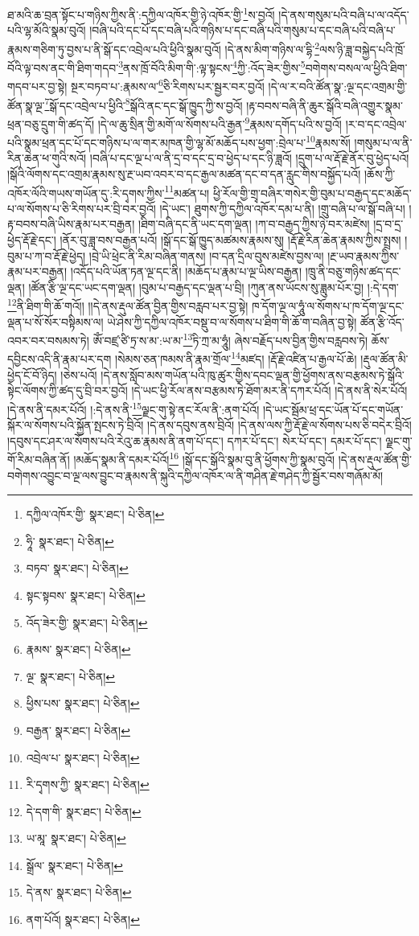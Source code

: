ཐ་མའི་ཆ་བྲན་སྟོང་པ་གཉིས་ཀྱིས་ནི་:དཀྱིལ་འཁོར་གྱི་ཉེ་འཁོར་གྱི་\footnote{དཀྱིལ་འཁོར་གྱི་  སྣར་ཐང་།  པེ་ཅིན། }ས་བྱའོ། །དེ་ནས་གསུམ་པའི་བཞི་པ་ལ་འདོད་པའི་ལྷ་མོའི་སྣམ་བུའོ། །བཞི་པའི་དང་པོ་དང་བཞི་པའི་གཉིས་པ་དང་བཞི་པའི་གསུམ་པ་དང་བཞི་པའི་བཞི་པ་རྣམས་གཅིག་ཏུ་བྱས་པ་ནི་སྒོ་དང་འབྲེལ་པའི་ཕྱིའི་སྣམ་བུའོ། །དེ་ནས་མིག་གཉིས་ལ་དྷི་\footnote{ཧཱི་  སྣར་ཐང་།  པེ་ཅིན། }ལས་ཉི་ཟླ་བསྐྱེད་པའི་ཁྲོ་བོའི་ལྟ་བས་ནང་གི་ཐིག་གདབ་\footnote{བཏབ་  སྣར་ཐང་།  པེ་ཅིན། }ནས་ཁྲོ་བོའི་མིག་གི་:ལྟ་སྟངས་\footnote{སྟང་སྟབས་  སྣར་ཐང་།  པེ་ཅིན། }ཀྱི་:འོད་ཟེར་གྱིས་\footnote{འོད་ཟེར་གྱི་  སྣར་ཐང་།  པེ་ཅིན། }བགེགས་བསལ་ལ་ཕྱིའི་ཐིག་གདབ་པར་བྱ་སྟེ། སྔར་བཏབ་པ་:རྣམས་ལ་\footnote{རྣམས་  སྣར་ཐང་།  པེ་ཅིན། }ཅི་རིགས་པར་སྦྱར་བར་བྱའོ། །དེ་ལ་ར་བའི་ཚོན་སྣ་:ལྔ་དང་འགྲམ་གྱི་ཚོན་སྣ་ལྔ་\footnote{ལྔ་  སྣར་ཐང་།  པེ་ཅིན། }སྒོ་དང་འབྲེལ་པ་ཕྱིའི་\footnote{ཕྱིས་པས་  སྣར་ཐང་།  པེ་ཅིན། }སྒོའི་ནང་དང་སྒོ་ཁྱུད་ཀྱི་ས་བྱའོ། །རྟ་བབས་བཞི་ནི་ཆུར་སྒོའི་བཞི་འགྱུར་སྣམ་ཕྲན་བཅུ་དྲུག་གི་ཚད་དོ། །དེ་ལ་ཆུ་སྲིན་གྱི་མགོ་ལ་སོགས་པའི་རྒྱན་\footnote{བརྒྱན་  སྣར་ཐང་།  པེ་ཅིན། }རྣམས་དགོད་པའི་ས་བྱའོ། །ར་བ་དང་འབྲེལ་པའི་སྣམ་ཕྲན་དང་པོ་དང་གཉིས་པ་ལ་གར་མཁན་གྱི་ལྷ་མོ་མཆོད་པས་ཕྱག་:བྲེལ་པ་\footnote{འབྲེལ་པ་  སྣར་ཐང་།  པེ་ཅིན། }རྣམས་སོ། །གསུམ་པ་ལ་ནི་རིན་ཆེན་ཕ་གུའི་སའོ། །བཞི་པ་དང་ལྔ་པ་ལ་ནི་དྲ་བ་དང་དྲ་བ་ཕྱེད་པ་དང་ཉི་ཟླའོ། །དྲུག་པ་ལ་རྡོ་རྗེ་ནོར་བུ་ཕྱེད་པའོ། །སྒོའི་ལོགས་དང་འགྲམ་རྣམས་སུ་རྔ་ཡབ་འབར་བ་དང་རྒྱལ་མཚན་དང་བ་དན་རླུང་གིས་བསྐྱོད་པའོ། །ཆོས་ཀྱི་འཁོར་ལོའི་གཡས་གཡོན་དུ་:རི་དྭགས་ཀྱིས་\footnote{རི་དྭགས་ཀྱི་  སྣར་ཐང་།  པེ་ཅིན། }མཚན་པ། ཕྱི་རོལ་གྱི་གྲྭ་བཞིར་གསེར་གྱི་བུམ་པ་བརྒྱད་དང་མཆོད་པ་ལ་སོགས་པ་ཅི་རིགས་པར་བྲི་བར་བྱའོ། །དེ་ཡང་། ཐུགས་ཀྱི་དཀྱིལ་འཁོར་དམ་པ་ནི། །གྲུ་བཞི་པ་ལ་སྒོ་བཞི་པ། །རྟ་བབས་བཞི་ཡིས་རྣམ་པར་བརྒྱན། །ཐིག་བཞི་དང་ནི་ཡང་དག་ལྡན། །ཀ་བ་བརྒྱད་ཀྱིས་ཉེ་བར་མཛེས། །དྲ་བ་དྲ་ཕྱེད་རྡོ་རྗེ་དང་། །ནོར་བུ་ཟླ་བས་བརྒྱན་པའོ། །སྒོ་དང་སྒོ་ཁྱུད་མཚམས་རྣམས་སུ། །རྡོ་རྗེ་རིན་ཆེན་རྣམས་ཀྱིས་སྤྲས། །བུམ་པ་ཀ་བ་རྡོ་རྗེ་ཕྱེད། །བྲེ་ཡི་ཕྲེང་ནི་རིམ་བཞིན་གནས། །བ་དན་དྲིལ་བུས་མཛེས་བྱས་ལ། །རྔ་ཡབ་རྣམས་ཀྱིས་རྣམ་པར་བརྒྱན། །འདོད་པའི་ཡོན་ཏན་ལྔ་དང་ནི། །མཆོད་པ་རྣམ་པ་ལྔ་ཡིས་བརྒྱན། །ཁྲུ་ནི་བཅུ་གཉིས་ཚད་དང་ལྡན། །ཚོན་རྩི་ལྔ་དང་ཡང་དག་ལྡན། །བུམ་པ་བརྒྱད་དང་ལྡན་པ་བྲི། །ཀུན་ནས་ཡོངས་སུ་ཟླུམ་པོར་བྱ། །:དེ་དག་\footnote{དེ་དག་གི་  སྣར་ཐང་།  པེ་ཅིན། }ནི་ཐིག་གི་ཆོ་གའོ།། །།དེ་ནས་རྡུལ་ཚོན་བྱིན་གྱིས་བརླབ་པར་བྱ་སྟེ། ཁ་དོག་ལྔ་ལ་ཧཱུཾ་ལ་སོགས་པ་ཁ་དོག་ལྔ་དང་ལྡན་པ་སོ་སོར་བསྟིམས་ལ། ཡེ་ཤེས་ཀྱི་དཀྱིལ་འཁོར་བསྡུ་བ་ལ་སོགས་པ་ཐིག་གི་ཆོ་ག་བཞིན་བྱ་སྟེ། ཚོན་རྩི་འོད་འབར་བར་བསམས་ཏེ། ཨོཾ་བཛྲ་ཙི་ཏྲ་ས་མ་:ཡ་མ་\footnote{ཡ་མཱ་  སྣར་ཐང་།  པེ་ཅིན། }ཏི་ཀྲ་མ་ཧཱུཾ། ཞེས་བརྗོད་པས་བྱིན་གྱིས་བརླབས་ཏེ། ཆོས་དབྱིངས་འདི་ནི་རྣམ་པར་དག །སེམས་ཅན་ཁམས་ནི་རྣམ་གྲོལ་\footnote{སྒྲོལ་  སྣར་ཐང་།  པེ་ཅིན། }མཛད། །རྡོ་རྗེ་འཛིན་པ་རྒྱལ་པོ་ཆེ། །རྡུལ་ཚོན་མི་ཕྱེད་ངོ་བོ་ཉིད། །ཅེས་པའོ། །དེ་ནས་སློབ་མས་གཡོན་པའི་ཁུ་ཚུར་གྱིས་དབང་ལྡན་གྱི་ཕྱོགས་ནས་བརྩམས་ཏེ་སྒོའི་སྟེང་ལོགས་ཀྱི་ཚད་དུ་བྲི་བར་བྱའོ། །དེ་ཡང་ཕྱི་རོལ་ནས་བརྩམས་ཏེ་ཐོག་མར་ནི་དཀར་པོའོ། །དེ་ནས་ནི་སེར་པོའོ། །དེ་ནས་ནི་དམར་པོའོ། །:དེ་ནས་ནི་\footnote{དེ་ནས་  སྣར་ཐང་།  པེ་ཅིན། }ལྗང་གུ་སྟེ་ནང་རོལ་ནི་:ནག་པོའོ། །དེ་ཡང་སྦོམ་ཕྲ་དང་ཡོན་པོ་དང་གཡོན་སྐོར་ལ་སོགས་པའི་སྐྱོན་སྤངས་ཏེ་བྲིའོ། །དེ་ནས་དབུས་ནས་བྲིའོ། །དེ་ནས་ལས་ཀྱི་རྡོ་རྗེ་ལ་སོགས་པས་ཅི་བདེར་བྲིའོ། །དབུས་དང་ཤར་ལ་སོགས་པའི་རེའུ་ཆ་རྣམས་ནི་ནག་པོ་དང་། དཀར་པོ་དང་། སེར་པོ་དང་། དམར་པོ་དང་། ལྗང་གུ་གོ་རིམ་བཞིན་ནོ། །མཆོད་སྣམ་ནི་དམར་པོའོ།\footnote{ནག་པོའོ།  སྣར་ཐང་།  པེ་ཅིན། } །སྒོ་དང་སྒོའི་སྣམ་བུ་ནི་ཕྱོགས་ཀྱི་སྣམ་བུའོ། །དེ་ནས་རྡུལ་ཚོན་གྱི་བགེགས་འབྱུང་བ་ལྔ་ལས་བྱུང་བ་རྣམས་ནི་སྐུའི་དཀྱིལ་འཁོར་ལ་ནི་གཤིན་རྗེ་གཤེད་ཀྱི་སྦྱོར་བས་གཞོམ་མོ། 